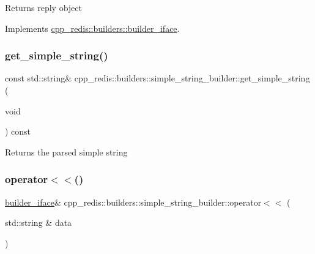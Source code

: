 \begin{DoxyReturn}{Returns}
reply object 
\end{DoxyReturn}


Implements \mbox{\hyperlink{classcpp__redis_1_1builders_1_1builder__iface_afd2ff2c2371c2a486116543b638b9413}{cpp\+\_\+redis\+::builders\+::builder\+\_\+iface}}.

\mbox{\label{classcpp__redis_1_1builders_1_1simple__string__builder_a539ba8a9234269e57471f1973adc58c2}} 
\subsubsection{\texorpdfstring{get\+\_\+simple\+\_\+string()}{get\_simple\_string()}}
{\footnotesize\ttfamily const std\+::string\& cpp\+\_\+redis\+::builders\+::simple\+\_\+string\+\_\+builder\+::get\+\_\+simple\+\_\+string (\begin{DoxyParamCaption}\item[{void}]{ }\end{DoxyParamCaption}) const}

\begin{DoxyReturn}{Returns}
the parsed simple string 
\end{DoxyReturn}
\mbox{\label{classcpp__redis_1_1builders_1_1simple__string__builder_a159bb512f0427c4a988742f7cd01035e}} 
\subsubsection{\texorpdfstring{operator$<$$<$()}{operator<<()}}
{\footnotesize\ttfamily \mbox{\hyperlink{classcpp__redis_1_1builders_1_1builder__iface}{builder\+\_\+iface}}\& cpp\+\_\+redis\+::builders\+::simple\+\_\+string\+\_\+builder\+::operator$<$$<$ (\begin{DoxyParamCaption}\item[{std\+::string \&}]{data }\end{DoxyParamCaption})\hspace{0.3cm}{\ttfamily [virtual]}}

